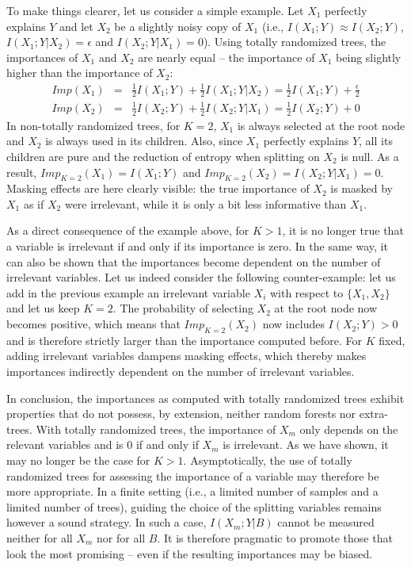\documentclass{article}
\begin{document}
To make things clearer, let us consider a simple example. Let $X_1$ perfectly explains $Y$
 and let $X_2$ be a slightly noisy copy of $X_1$ (i.e., $I(X_1;Y)
\approx I(X_2;Y)$, $I(X_1;Y|X_2)=\epsilon$ and $I(X_2;Y|X_1)=0$). Using totally
randomized trees, the importances of $X_1$ and $X_2$ are nearly equal -- the
importance of $X_1$ being slightly higher than the importance of $X_2$:
\begin{eqnarray*}
Imp(X_1) &=& \frac{1}{2} I(X_1;Y) + \frac{1}{2} I(X_1;Y|X_2) = \frac{1}{2} I(X_1;Y) + \frac{\epsilon}{2}\\
Imp(X_2) &=& \frac{1}{2} I(X_2;Y) + \frac{1}{2} I(X_2;Y|X_1) = \frac{1}{2} I(X_2;Y) + 0
\end{eqnarray*}
In non-totally randomized trees, for $K=2$, $X_1$ is always selected at the root
node and $X_2$ is always used in its children. Also, since $X_1$ perfectly
explains $Y$, all its children are pure and the reduction of entropy when
splitting on $X_2$ is null. As a result, $Imp_{K=2}(X_1) = I(X_1;Y)$ and
$Imp_{K=2}(X_2) = I(X_2;Y|X_1) = 0$. Masking effects are here
clearly visible: the true importance of $X_2$ is masked by $X_1$ as if $X_2$
were irrelevant, while it is only a bit less informative than $X_1$.

As a direct consequence of the example above, for $K>1$, it is no longer true
that a variable is irrelevant if and only if its importance is zero. In the same
way, it can also be shown that the importances become dependent on the number of
irrelevant variables. Let us indeed consider the following counter-example: let
us add in the previous example an irrelevant variable $X_i$ with respect to
$\{X_1, X_2\}$ and let us keep $K=2$. The probability of selecting $X_2$ at the
root node now becomes positive, which means that $Imp_{K=2}(X_2)$ now includes
$I(X_2;Y)>0$ and is therefore strictly larger than the importance computed
before. For $K$ fixed, adding irrelevant variables dampens masking effects,
which thereby makes importances indirectly dependent on the number of irrelevant
variables.

In conclusion, the importances as computed with totally randomized trees
exhibit properties that do not possess, by extension, neither random forests nor
extra-trees. With totally randomized trees, the importance of
$X_m$ only depends on the relevant variables and is 0 if and only if $X_m$ is
irrelevant. As we have shown, it may no longer be the case for $K>1$.
Asymptotically, the use of totally randomized trees for assessing the importance of
a variable may therefore be more appropriate. In a finite setting (i.e., a
limited number of samples and a limited number of trees), guiding the choice of
the splitting variables remains however a sound strategy. In such a case,
$I(X_m;Y|B)$ cannot be measured neither for all $X_m$ nor for all $B$. It is
therefore  pragmatic to promote those that look the most promising -- even if
the resulting importances may be biased.
\end{document}
